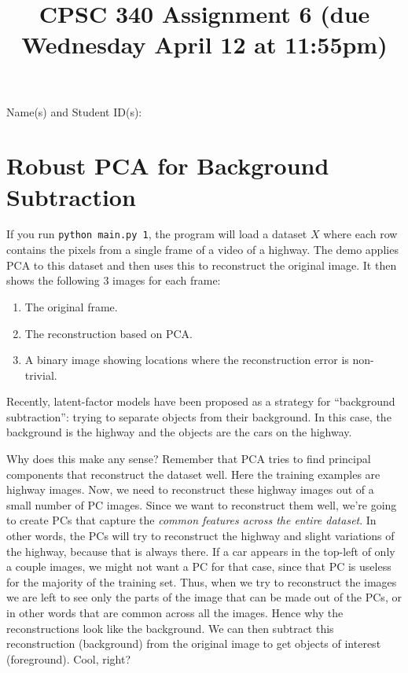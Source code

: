 \documentclass{article}
\newcommand{\blu}[1]{{\textcolor{blu}{#1}}}
\begin{document}
\title{CPSC 340 Assignment 6 (due Wednesday April 12 at 11:55pm)}
\date{}
\maketitle
\vspace{-6em}

\blu{Name(s) and Student ID(s):}

\section{Robust PCA for Background Subtraction}

If you run \verb|python main.py 1|, the program will load a dataset $X$ where each row contains the pixels from a single frame of a video of a highway. The demo applies PCA to this dataset and then uses this to reconstruct the original image.
It then shows the following 3 images for each frame:
\begin{enumerate}
	\item The original frame.
	\item The reconstruction based on PCA.
	\item A binary image showing locations where the reconstruction error is non-trivial.
\end{enumerate}
Recently, latent-factor models have been proposed as a strategy for ``background subtraction'': trying to separate objects from their background. In this case, the background is the highway and the objects are the cars on the highway.

Why does this make any sense? Remember that PCA tries to find principal components that reconstruct the dataset well. Here the training examples are highway images. Now, we need to reconstruct these highway images out of a small number of PC images. Since we want to reconstruct them well, we're going to create PCs that capture the \emph{common features across the entire dataset}. In other words, the PCs will try to reconstruct the highway and slight variations of the highway, because that is always there. If a car appears in the top-left of only a couple images, we might not want a PC for that case, since that PC is useless for the majority of the training set. Thus, when we try to reconstruct the images we are left to see only the parts of the image that can be made out of the PCs, or in other words that are common across all the images. Hence why the reconstructions look like the background. We can then subtract this reconstruction (background) from the original image to get objects of interest (foreground). Cool, right?
\end{document}
